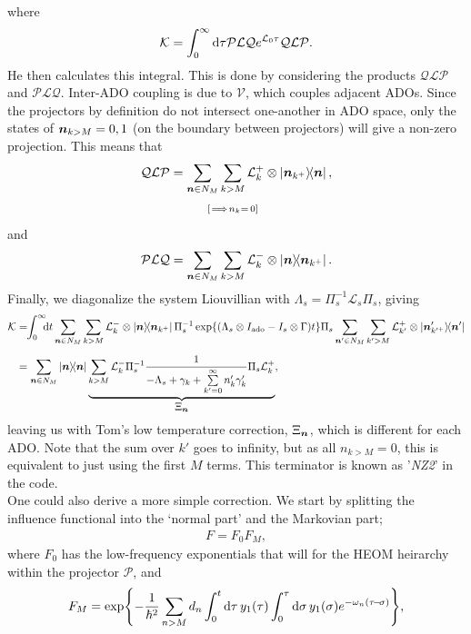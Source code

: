 \documentclass{article}
\begin{document}
where 
\begin{align}
    \mathcal{K} = \int_0^\infty{\rm d}\tau \mathcal{PLQ}e^{\mathcal{L}_0\tau}\mathcal{QLP}.
\end{align}
He then calculates this integral. This is done by considering the products $\mathcal{QLP}$ and $\mathcal{PLQ}$. Inter-ADO coupling is due to $\mathcal{V}$, which couples adjacent ADOs. Since the projectors by definition do not intersect one-another in ADO space, only the states of $\boldsymbol{n}_{k>M}=0,1$ (on the boundary between projectors) will give a non-zero projection. This means that
\begin{align}
    \mathcal{QLP} = \sum_{\vc{n}\in N_M}\sum_{\underset{\mathclap{\mathlarger{\vphantom{\frac{\int}{}}[\!\implies \!n_k=\,0]}}}{k>M}} \mathcal{L}_k^+\otimes\ketbra{\vc{n}_{k^+}}{\vc{n}},
\end{align}
and 
\begin{align}
    \mathcal{PLQ} =\sum_{\boldsymbol{n}\in N_M}\sum_{k>M} \mathcal{L}_k^-\otimes\ketbra{\boldsymbol{n}}{\boldsymbol{n}_{k^+}}.
\end{align}
Finally, we diagonalize the system Liouvillian with $\Lambda_s = \Pi_s^{-1}\mathcal{L}_s\Pi_s$, giving
\begin{align}
    \mathcal{K} &= \!\!\int_0^\infty\!\!\! \d t\sum_{\vc{n}\in N_M}\sum_{k>M} \mathcal{L}_k^-\otimes\ketbra{\vc{n}}{\vc{n}_{k^+}}\Pi_s^{-1}\exp{(\Lambda_s\otimes I_{\rm{ado}}-I_{s}\otimes \Gamma)t}\Pi_s
    \sum_{\vc{n}'\in N_M}\sum_{k'>M} \mathcal{L}_{k'}^+\otimes\ketbra{\vc{n}'_{k'^+}}{\vc{n}'}\nonumber \\[6pt]
    &= \sum_{\vc{n}\in N_M}\ketbra{\vc{n}}\underbrace{\sum_{k>M} \mathcal{L}_k^-\Pi_s^{-1}\frac{1}{-\Lambda_s + \gamma_k + \sum\limits_{k'=0}^{\infty}n_k'\gamma_k'}\Pi_s\mathcal{L}_{k}^+}_{\mathlarger{\Xi_{\vc{n}}}}
    ,
\end{align}
leaving us with Tom's low temperature correction, $\Xi_{\boldsymbol{n}}$, which is different for each ADO. Note that the sum over $k'$ goes to infinity, but as all $n_{k>M}=0$, this is equivalent to just using the first $M$ terms. This terminator is known as '\textit{NZ2}' in the code.
 \\[6pt]
One could also derive a more simple correction. We start by splitting the influence functional into the `normal part' and the Markovian part;
\begin{align}
    F=F_0F_M,
\end{align}
where $F_0$ has the low-frequency exponentials that will for the HEOM heirarchy within the projector $\mathcal{P}$, and
\begin{align}
    F_M= 
    \exp{
        -\frac{1}{\hbar^2}\sum_{n>M}d_n\int_0^t{\rm d}\tau\,y_1(\tau)\int_0^\tau{\rm d}\sigma \,y_1(\sigma)e^{-\omega_n(\tau\!-\!\sigma)}},
    \end{align}
\end{document}
